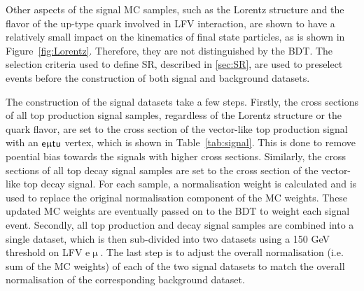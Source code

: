Other aspects of the signal \ac{MC} samples, such as the Lorentz structure and the flavor of the up-type quark involved in LFV interaction, are shown to have a relatively small impact on the kinematics of final state particles, as is shown in Figure~\ref{fig:Lorentz}. Therefore, they are not distinguished by the \ac{BDT}. The selection criteria used to define \ac{SR}, described in \autoref{sec:SR}, are used to preselect events before the construction of both signal and background datasets. 

The construction of the signal datasets take a few steps. Firstly, the cross sections of all top production signal samples, regardless of the Lorentz structure or the quark flavor, are set to the cross section of the vector-like top production signal with an $\textsf{e}\upmu\textsf{t{u}}$ vertex, which is shown in Table~\ref{tab:signal}. This is done to remove poential bias towards the signals with higher cross sections. Similarly, the cross sections of all top decay signal samples are set to the cross section of the vector-like top decay signal. For each sample, a normalisation weight is calculated and is used to replace the original normalisation component of the \ac{MC} weights. These updated \ac{MC} weights are eventually passed on to the \ac{BDT} to weight each signal event.  Secondly, all top production and decay signal samples are combined into a single dataset, which is then sub-divided into two datasets using a 150 GeV threshold on LFV e$\upmu$. The last step is to adjust the overall normalisation (i.e. sum of the \ac{MC} weights) of each of the two signal datasets to match the overall normalisation of the corresponding background dataset. 

